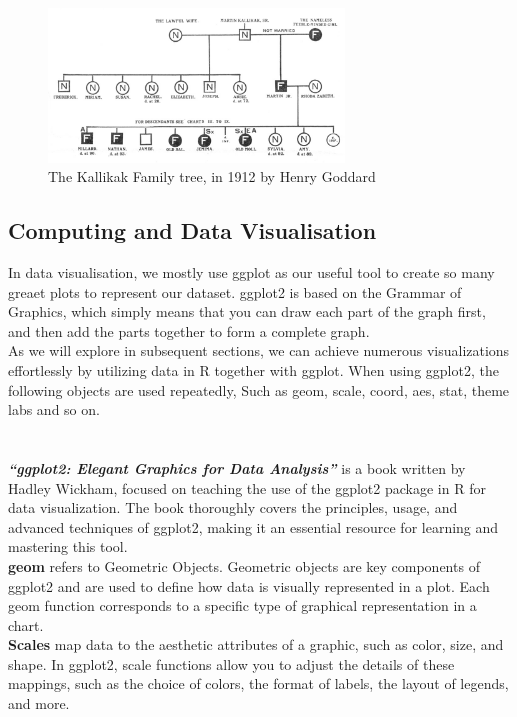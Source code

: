 \documentclass{article}\usepackage[]{graphicx}\usepackage[]{xcolor}
\begin{document}
\begin{figure}[H]
    \centering
    \includegraphics[width=0.7\textwidth]{familytree.jpg}
    \caption{The Kallikak Family tree, in 1912 by Henry Goddard }
    \label{fig:familytree}
\end{figure}

\subsection{Computing and Data Visualisation}
In data visualisation, we mostly use ggplot as our useful tool to create so many greaet plots to represent our dataset. ggplot2 is based on the Grammar of Graphics, which simply means that you can draw each part of the graph first, and then add the parts together to form a complete graph.\\
As we will explore in subsequent sections, we can achieve numerous visualizations effortlessly by utilizing data in R together with ggplot.
When using ggplot2, the following objects are used repeatedly, Such as geom, scale, coord, aes, stat, theme labs and so on.\\\\\\
\textbf{\textit{``ggplot2: Elegant Graphics for Data Analysis''}} is a book written by Hadley Wickham, focused on teaching the use of the ggplot2 package in R for data visualization. The book thoroughly covers the principles, usage, and advanced techniques of ggplot2, making it an essential resource for learning and mastering this tool.\\
\textbf{geom} refers to Geometric Objects. Geometric objects are key components of ggplot2 and are used to define how data is visually represented in a plot. Each geom function corresponds to a specific type of graphical representation in a chart.\\
\textbf{Scales} map data to the aesthetic attributes of a graphic, such as color, size, and shape. In ggplot2, scale functions allow you to adjust the details of these mappings, such as the choice of colors, the format of labels, the layout of legends, and more.\\
\end{document}
